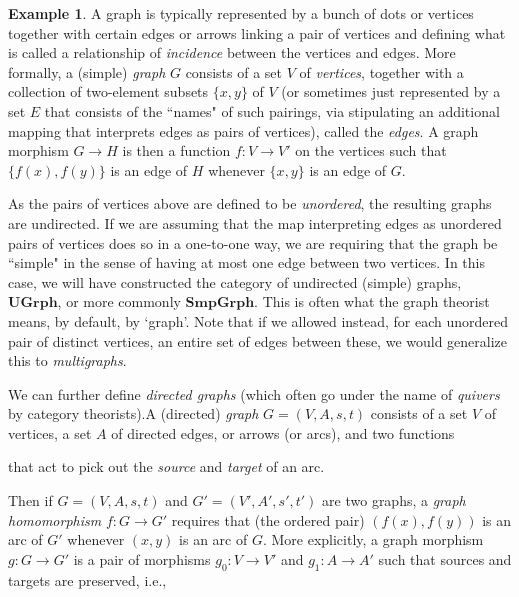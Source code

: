 \documentclass[a4paper]{book}
\theoremstyle{definition}
\newtheorem{example}{Example}[section]
\theoremstyle{definition}
\theoremstyle{definition}
\theoremstyle{theorem}
\theoremstyle{definition}
\begin{document}
\begin{example}
	A graph  is typically represented by a bunch of dots or vertices together with certain edges or arrows linking a pair of vertices and defining what is called a relationship of \textit{incidence} between the vertices and edges. More formally, a (simple) \textit{graph} $G$ consists of a set $V$ of \textit{vertices}, together with a collection of two-element subsets $\{x,y\}$ of $V$ (or sometimes just represented by a set $E$ that consists of the ``names" of such pairings, via stipulating an additional mapping that interprets edges as pairs of vertices), called the \textit{edges}. A graph morphism $G \rightarrow H$ is then a function $f: V \rightarrow V'$ on the vertices such that $\{f(x), f(y)\}$ is an edge of $H$ whenever $\{x,y\}$ is an edge of $G$.\par
	As the pairs of vertices above are defined to be \textit{unordered}, the resulting graphs are undirected. If we are assuming that the map interpreting edges as unordered pairs of vertices does so in a one-to-one way, we are requiring that the graph be ``simple" in the sense of having at most one edge between two vertices. In this case, we will have constructed the category of undirected (simple) graphs, $\textbf{UGrph}$, or more commonly $\textbf{SmpGrph}$. This is often what the graph theorist means, by default, by `graph'. Note that if we allowed instead, for each unordered pair of distinct vertices, an entire set of edges between these, we would generalize this to \textit{multigraphs}.\par   
	We can further define \textit{directed graphs} (which often go under the name of \textit{quivers} by category theorists).\label{example: graph} A (directed) \textit{graph} $G = (V, A, s, t)$ consists of a set $V$ of vertices, a set $A$ of directed edges, or arrows (or arcs), and two functions 
		\begin{center} 
	\end{center} 
that act to pick out the \textit{source} and \textit{target} of an arc. \par 
Then if $G = (V, A, s,t)$ and $G' = (V', A', s', t')$ are two graphs, a \textit{graph homomorphism} $f: G \rightarrow G'$ requires that (the ordered pair) $(f(x), f(y))$ is an arc of $G'$ whenever $(x,y)$ is an arc of $G$. More explicitly, a graph morphism $g: G \rightarrow G'$ is a pair of morphisms $g_0: V \rightarrow V'$ and $g_1: A \rightarrow A'$ such that sources and targets are preserved, i.e., 

\end{example}
\end{document}
